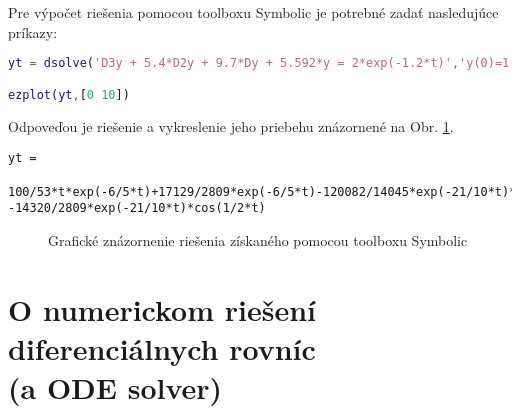 \documentclass[a4paper, 10pt, ]{article}
\begin{document}
Pre výpočet riešenia pomocou toolboxu Symbolic je potrebné zadať nasledujúce príkazy:
\begin{lstlisting}[language=Matlab,]
yt = dsolve('D3y + 5.4*D2y + 9.7*Dy + 5.592*y = 2*exp(-1.2*t)','y(0)=1','Dy(0)=1','D2y(0)=1')

ezplot(yt,[0 10])
\end{lstlisting}
Odpoveďou je riešenie a vykreslenie jeho priebehu znázornené na Obr. \ref{Grafické znázornenie riešenia získaného Symbolic}.
{\footnotesize
\begin{verbatim}
yt =

100/53*t*exp(-6/5*t)+17129/2809*exp(-6/5*t)-120082/14045*exp(-21/10*t)*sin(1/2*t)
-14320/2809*exp(-21/10*t)*cos(1/2*t)
\end{verbatim}}


\begin{figure}[!ht]
	\centering


	\caption{Grafické znázornenie riešenia získaného pomocou toolboxu Symbolic}
	\label{Grafické znázornenie riešenia získaného Symbolic}
\end{figure}













































\section[O numerickom riešení diferenciálnych rovníc (a ODE solver)]{O numerickom riešení diferenciálnych rovníc\\ (a ODE solver)}
\end{document}
